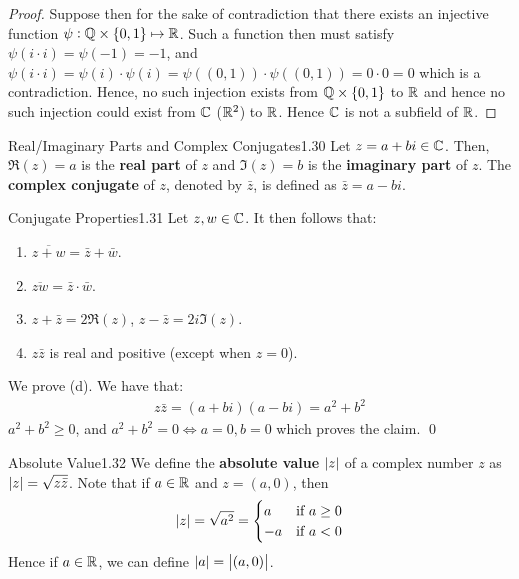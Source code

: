 \begin{proof}
    Suppose then for the sake of contradiction that there exists an injective function $\psi: \mathbb{Q} \times \set{0, 1} \mapsto \mathbb{R}$. Such a function then must satisfy$\psi(i \cdot i) = \psi(-1) = -1$, and $\psi(i \cdot i) = \psi(i) \cdot \psi(i) = \psi((0, 1))\cdot \psi((0, 1)) = 0 \cdot 0 = 0$ which is a contradiction. Hence, no such injection exists from $\mathbb{Q} \times \set{0, 1}$ to $\mathbb{R}$ and hence no such injection could exist from $\mathbb{C}$ ($\mathbb{R}^2$) to $\mathbb{R}$. Hence $\mathbb{C}$ is not a subfield of $\mathbb{R}$. 
\end{proof}



\begin{definition}{Real/Imaginary Parts and Complex Conjugates}{1.30}
Let $z = a + bi \in \mathbb{C}$. Then, $\Re(z) = a$ is the \textbf{real part} of $z$ and $\Im(z) = b$ is the \textbf{imaginary part} of $z$. The \textbf{complex conjugate} of $z$, denoted by $\bar{z}$, is defined as $\bar{z} = a - bi$. 
\end{definition}

\begin{theorem}{Conjugate Properties}{1.31}
    Let $z, w \in \mathbb{C}$. It then follows that:
    \begin{enumerate}
        \item $\overline{z + w} = \bar{z} + \bar{w}$.
        \item $\overline{zw} = \bar{z} \cdot \bar{w}$.
        \item $z + \bar{z} = 2\Re(z)$, $z - \bar{z} = 2i\Im(z)$.
        \item $z\bar{z}$ is real and positive (except when $z = 0$).
    \end{enumerate}
\end{theorem}

\begin{nproof}
    We prove (d). We have that:
    \begin{align*}
        z\bar{z} = (a + bi)(a-bi) = a^2 + b^2 
    \end{align*}
    $a^2 + b^2 \geq 0$, and $a^2 + b^2 = 0 \iff a = 0, b = 0$ which proves the claim. \qed
\end{nproof}

\begin{definition}{Absolute Value}{1.32}
    We define the \textbf{absolute value} $\abs{z}$ of a complex number $z$ as $\abs{z} = \sqrt{z\bar{z}}$. Note that if $a \in \mathbb{R}$ and $z = (a, 0)$, then
    \begin{align*}
        \abs{z} = \sqrt{a^2} =
        \begin{cases}
            a & \text{if $a \geq 0$}
            \\ -a & \text{if $a < 0$}
        \end{cases}
    \end{align*}
    Hence if $a \in \mathbb{R}$, we can define $\abs{a} = \abs{(a, 0)}$. 
\end{definition}

